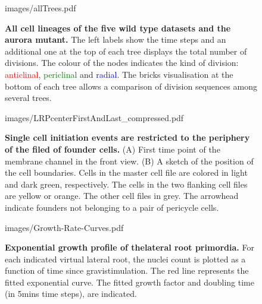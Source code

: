 \documentclass[11pt,a4paper, final]{article}
\begin{document}
\clearpage
%
%
\begin{figure}
	\begin{center}
		\begin{overpic}[width=1.\linewidth]{images/allTrees.pdf}
		\end{overpic}
\caption[All cell lineages of the five wild type datasets and the aurora mutant.]
{
{\bf All cell lineages of the five wild type datasets and the aurora mutant.} The left labels show the time steps and an additional one at the top of each tree displays the total number of divisions. The colour of the nodes indicates the kind of division: \textcolor{red}{anticlinal}, \textcolor{green}{periclinal} and \textcolor{blue}{radial}. The bricks visualisation at the bottom of each tree allows a comparison of division sequences among several trees.
}
	\label{fig:allTrees}
	\end{center}
\end{figure}
\clearpage
%
\begin{figure}[htbp]
	\begin{center}
	\begin{overpic}[width=0.5\linewidth]{images/LRPcenterFirstAndLast_compressed.pdf}
	\end{overpic}
\caption[Single cell initiation events are restricted to the periphery of the filed of founder cells.]
{{\bf Single cell initiation events are restricted to the periphery of the filed of founder cells.} (A) First time point of the membrane channel in the front view. (B) A sketch of the position of the cell boundaries. Cells in the master cell file are colored in light and dark green, respectively. The cells in the two flanking cell files are yellow or orange. The other cell files in grey. The arrowhead indicate founders not belonging to a pair of pericycle cells.}
	\label{fig:founderstop}
	\end{center}
\end{figure}
%
\clearpage
%
%
\begin{figure}[htbp]
	\begin{center}
	\begin{overpic}[width=1.\linewidth]{images/Growth-Rate-Curves.pdf}
	\end{overpic}
\caption[Exponential growth profile of the lateral root primordia.]
{{\bf Exponential growth profile of thelateral root primordia.} For each indicated virtual lateral root, the nuclei count is plotted as a function of time since gravistimulation. The red line represents the fitted exponential curve. The fitted growth factor and doubling time (in 5mins time steps), are indicated.}
	\label{fig:growthcurves}
	\end{center}
\end{figure}
\end{document}
